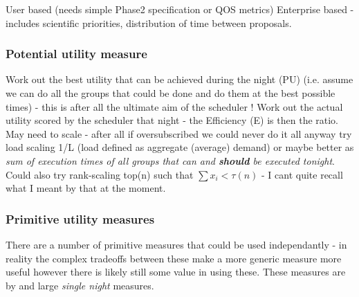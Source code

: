User based (needs simple Phase2 specification or QOS metrics)
Enterprise based - includes scientific priorities, distribution of time between proposals.

\subsubsection{Potential utility measure} Work out the best utility that can be achieved during the night (PU) (i.e. assume we can do all the groups that could be done and do them at the best possible times) - this is after all the ultimate aim of the scheduler ! Work out the actual utility scored by the scheduler that night - the Efficiency (E) is then the ratio. May need to scale - after all if oversubscribed we could never do it all anyway try load scaling 1/L (load defined as aggregate (average) demand) or maybe better as \emph{sum of execution times of all groups that can and {\bf should} be executed tonight}. Could also try rank-scaling top(n) such that $\sum{x_i} < \tau(n)$ - I cant quite recall what I meant by that at the moment.


\subsubsection{Primitive utility measures}
There are a number of primitive measures that could be used independantly - in reality the complex tradeoffs between these make a more generic measure more useful however there is likely still some value in using these. These measures are by and large \emph{single night} measures. 


